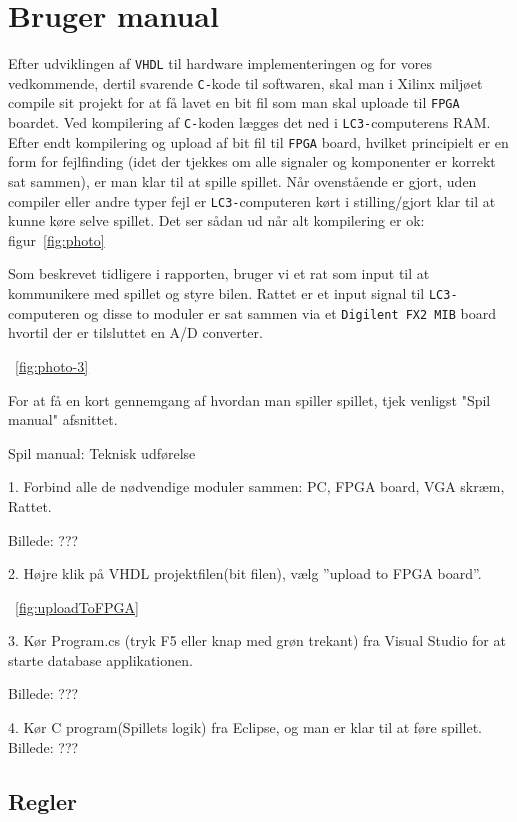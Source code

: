 \section{Bruger manual}
Efter udviklingen af \texttt{VHDL} til hardware implementeringen og for vores vedkommende, dertil svarende \texttt{C-}kode til softwaren, skal man i Xilinx miljøet compile sit projekt for at få lavet en bit fil som man skal uploade til \texttt{FPGA} boardet. Ved kompilering af \texttt{C-}koden lægges det ned i \texttt{LC3-}computerens RAM.   
Efter endt kompilering og upload af bit fil til \texttt{FPGA} board, hvilket principielt er en form for fejlfinding (idet der tjekkes om alle signaler og komponenter er korrekt sat sammen), er man klar til at spille spillet. Når ovenstående er gjort, uden compiler eller andre typer fejl er \texttt{LC3-}computeren kørt i stilling/gjort klar til at kunne køre selve spillet.
Det ser sådan ud når alt kompilering er ok:
figur~\vref{fig:photo}

Som beskrevet tidligere i rapporten, bruger vi et rat som input til at kommunikere med spillet og styre bilen. Rattet er et input signal til \texttt{LC3-}computeren og disse to moduler er sat sammen via et \texttt{Digilent FX2 MIB} board hvortil der er tilsluttet en A/D converter. 

~\vref{fig:photo-3}

For at få en kort gennemgang af hvordan man spiller spillet, tjek venligst "Spil manual" afsnittet. 


Spil manual:
Teknisk udførelse

1. Forbind alle de nødvendige moduler sammen: PC, FPGA board, VGA skræm, Rattet.

Billede: ???


2. Højre klik på VHDL projektfilen(bit filen), vælg ”upload to FPGA board”.

~\vref{fig:uploadToFPGA}

3. Kør Program.cs (tryk F5 eller knap med grøn trekant) fra Visual Studio for at starte database applikationen. 

Billede: ???

4. Kør C program(Spillets logik) fra Eclipse, og man er klar til at føre spillet. 
Billede: ???


\subsection{Regler}

